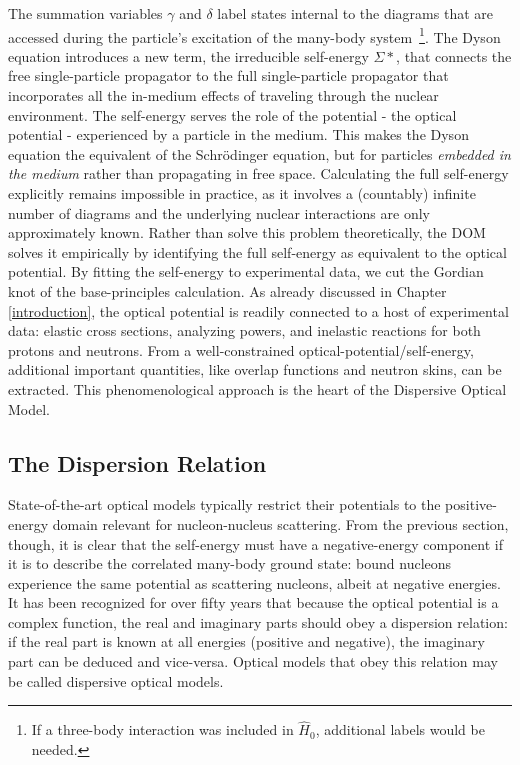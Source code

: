 The summation variables $\gamma$ and $\delta$ label states internal to the diagrams that are 
accessed during the particle's excitation of the many-body system\
\footnote{If a three-body interaction was included in $\hat{H}_{0}$, additional labels would be needed.}. The Dyson
equation introduces a new term, the irreducible self-energy $\Sigma*$, that connects the free
single-particle propagator to the full single-particle propagator that incorporates all the
in-medium effects of traveling through the nuclear environment. The self-energy serves the role
of the potential - the optical potential - experienced by a particle in the medium.
This makes the Dyson equation the
equivalent of the Schr\"odinger equation, but for particles \textit{embedded in the medium} 
rather than propagating in free space. Calculating the full self-energy explicitly remains
impossible in practice,
as it involves a (countably) infinite number of diagrams and the underlying nuclear
interactions are only approximately known. Rather than solve this problem
theoretically, the DOM solves it empirically by identifying the full self-energy as equivalent
to the optical potential. By fitting the self-energy to experimental data, we
cut the Gordian knot of the base-principles calculation. 
As already discussed in Chapter \ref{introduction}, the optical potential is  
readily connected to a host of experimental data: elastic cross sections, analyzing powers, and 
inelastic reactions for both protons and neutrons.
From a well-constrained optical-potential/self-energy, additional important quantities, like
overlap functions and neutron skins, can be extracted. This phenomenological approach is the 
heart of the Dispersive Optical Model.

\subsection{The Dispersion Relation}
State-of-the-art optical models \cite{CH89, KoningDelaroche} typically
restrict their potentials to the
positive-energy domain relevant for nucleon-nucleus scattering. From the previous
section, though, it is clear that the self-energy must have a negative-energy component
if it is to describe the
correlated many-body ground state: bound nucleons experience the same potential
as scattering nucleons, albeit at negative energies.
It has been recognized for over fifty years \cite{FeshbachDispersionRelation,
Passatore1967} that because the optical potential is a complex function, the real and imaginary
parts should obey a dispersion relation: if the real part is known at all energies (positive and
negative), the imaginary part can be deduced and vice-versa. Optical models that obey this relation
may be called dispersive optical models.

